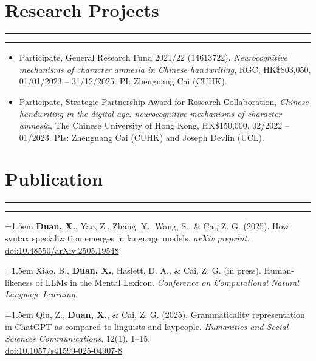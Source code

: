 \documentclass[11pt,a4paper]{article}
\begin{document}
\vspace{-1.5em} 
\section*{Research Projects}
\vspace{-.5em}
\hrule
\vspace{0.3ex}
\hrule

\begin{itemize}[leftmargin=*]
\item Participate, General Research Fund 2021/22 (14613722), \textit{Neurocognitive mechanisms of character amnesia in Chinese handwriting}, RGC, HK\$803,050, 01/01/2023 – 31/12/2025. PI: Zhenguang Cai (CUHK).

\item Participate, Strategic Partnership Award for Research Collaboration, \textit{Chinese handwriting in the digital age: neurocognitive mechanisms of character amnesia}, The Chinese University of Hong Kong, HK\$150,000, 02/2022 – 01/2023. PIs: Zhenguang Cai (CUHK) and Joseph Devlin (UCL).
    
\end{itemize}
\vspace{-1.5em} 
\section*{Publication}
\vspace{-.5em}
\hrule
\vspace{0.3ex}
\hrule

\hangindent=1.5em  \textbf{Duan, X.}, Yao, Z., Zhang, Y., Wang, S., \& Cai, Z. G. (2025). How syntax specialization emerges in language models. \textit{arXiv preprint}. \href{https://doi.org/10.48550/arXiv.2505.19548}{
doi:10.48550/arXiv.2505.19548}

\hangindent=1.5em  Xiao, B., \textbf{Duan, X.}, Haslett, D. A., \& Cai, Z. G. (in press). Human-likeness of LLMs in the Mental Lexicon. \textit{Conference on Computational Natural Language Learning}.

\hangindent=1.5em  Qiu, Z., \textbf{Duan, X.}, \& Cai, Z. G. (2025). Grammaticality representation in ChatGPT as compared to linguists and laypeople. \textit{Humanities and Social Sciences Communications}, 12(1), 1–15. \\
\href{https://doi.org/10.1057/s41599-025-04907-8}{doi:10.1057/s41599-025-04907-8}
\end{document}
